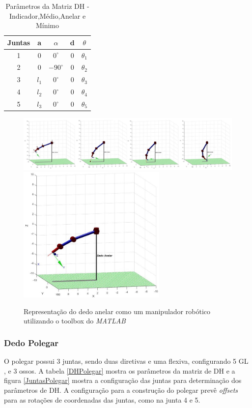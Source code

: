 \begin{table}[H]
\centering
\caption{Parâmetros da Matriz DH - Indicador,Médio,Anelar e Mínimo}
\label{DHResto}
\begin{tabular}{|c|c|c|c|c|}
	\hline
    Juntas & a & $\alpha$ & d & $\theta$ \\ \hline
    1 & 0 & $0^\circ$ & 0 & $\theta_1$ \\ \hline
    2 & 0 & $-90^\circ$ & 0 & $\theta_2$ \\ \hline
    3 & $l_1$ & $0^\circ$ & 0 & $\theta_3$ \\ \hline
    4 & $l_2$ & $0^\circ$ & 0 & $\theta_4$ \\ \hline
    5 & $l_3$ & $0^\circ$ & 0 & $\theta_5$ \\
	\hline
\end{tabular}
\end{table}

\begin{figure}[H]
\centering
\includegraphics[width = 1\textwidth]{img/Anelar.JPG}
\includegraphics[width = 0.65\textwidth]{img/Anelar1.JPG}
\caption[Representação do dedo anelar como um manipulador robótico]{Representação do dedo anelar como um manipulador robótico utilizando o toolbox do \textit{MATLAB} \cite{corke1996robotics}}
\label{JuntasResto}
\end{figure}



\subsubsection{Dedo Polegar}
O polegar possui 3 juntas, sendo duas diretivas e uma flexiva, configurando 5 GL \cite{lee1995model}, e 3 ossos. A tabela \ref{DHPolegar} mostra os parâmetros da matriz de DH e a figura \ref{JuntasPolegar} mostra a configuração das juntas para determinação dos parâmetros de DH. A configuração para a construção do polegar prevê \textit{offsets} para as rotações de coordenadas das juntas, como na junta 4 e 5.

